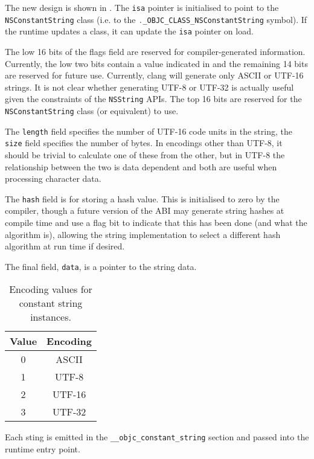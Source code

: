 \documentclass[a4paper]{report}
\newcommand{\ccode}[1]{\lstinline[language={C}]{#1}}
\newcommand{\objc}[1]{\lstinline[language={[Objective]C}]{#1}}
\newcommand{\inccode}[4]{
{
	 }}
	]{../#1}
}
}
\begin{document}
\sloppy
The new design is shown in .
The \ccode{isa} pointer is initialised to point to the \objc{NSConstantString} class (i.e. to the {\ccode{._OBJC_CLASS_NSConstantString}} symbol).
If the runtime updates a class, it can update the \ccode{isa} pointer on load.

The low 16 bits of the flags field are reserved for compiler-generated information.
Currently, the low two bits contain a value indicated in  and the remaining 14 bits are reserved for future use.
Currently, clang will generate only ASCII or UTF-16 strings.
It is not clear whether generating UTF-8 or UTF-32 is actually useful given the constraints of the \objc{NSString} APIs.
The top 16 bits are reserved for the \ccode{NSConstantString} class (or equivalent) to use.

The \ccode{length} field specifies the number of UTF-16 code units in the string, the \ccode{size} field specifies the number of bytes.
In encodings other than UTF-8, it should be trivial to calculate one of these from the other, but in UTF-8 the relationship between the two is data dependent and both are useful when processing character data.

The \ccode{hash} field is for storing a hash value.
This is initialised to zero by the compiler, though a future version of the ABI may generate string hashes at compile time and use a flag bit to indicate that this has been done (and what the algorithm is), allowing the string implementation to select a different hash algorithm at run time if desired.

The final field, \ccode{data}, is a pointer to the string data.

\inccode{loader.c}{nsconstantstring}{NSConstantString}{The constant string structure.}

\begin{table}
	\begin{center}
		\begin{tabular}{c|c}
			Value & Encoding \\ \hline
			0& ASCII \\
			1& UTF-8 \\
			2& UTF-16 \\
			3& UTF-32
		\end{tabular}
		\caption{\label{tab:nsconstantstring} Encoding values for constant string instances.}
	\end{center}
\end{table}

Each sting is emitted in the \ccode{__objc_constant_string} section and passed into the runtime entry point.
\end{document}
